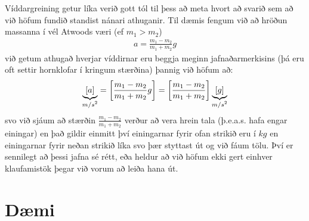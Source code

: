 \ifdefined \wholebook \else\documentclass[oneside]{book}\usepackage{EdlBook}\graphicspath{{figures/}}
\begin{document}
Víddargreining getur líka verið gott tól til þess að meta hvort að svarið sem að við höfum fundið standist nánari athuganir. Til dæmis fengum við að hröðun massanna í vél Atwoods væri (ef $m_1 > m_2$)
\begin{align*}
    a = \frac{m_1 - m_2}{m_1 + m_2}g
\end{align*}
við getum athugað hverjar víddirnar eru beggja meginn jafnaðarmerkisins (þá eru oft settir hornklofar í kringum stærðina) þannig við höfum að:
\begin{align*}
   \underbrace{ \left[ a \right]}_\textrm{$m/s^2$} = \left[ \frac{m_1 - m_2}{m_1 + m_2}g  \right] = \left[ \frac{m_1 - m_2}{m_1 + m_2} \right] \underbrace{\left[ g \right]}_\textrm{$m/s^2$}
\end{align*}
svo við sjáum að stærðin $\frac{m_1 - m_2}{m_1 + m_2}$ verður að vera hrein tala (þ.e.a.s. hafa engar einingar) en það gildir einmitt því einingarnar fyrir ofan strikið eru í $\si{kg}$ en einingarnar fyrir neðan strikið líka svo þær styttast út og við fáum tölu. Því er sennilegt að þessi jafna sé rétt, eða heldur að við höfum ekki gert einhver klaufamistök þegar við vorum að leiða hana út. \\


\newpage

\section{Dæmi}
\end{document}
